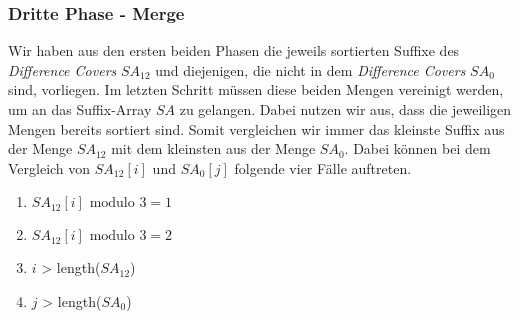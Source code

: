 \subsubsection{Dritte Phase - Merge}
\label{dc3:algorithmus:phase3}


Wir haben aus den ersten beiden Phasen die jeweils sortierten Suffixe des \emph{Difference Covers} $SA_{12}$ und diejenigen, die nicht in dem \emph{Difference Covers} $SA_{0}$ sind, vorliegen. Im letzten Schritt müssen diese beiden Mengen vereinigt werden, um an das Suffix-Array $SA$ zu gelangen. Dabei nutzen wir aus, dass die jeweiligen Mengen bereits sortiert sind. Somit vergleichen wir immer das kleinste Suffix aus der Menge $SA_{12}$ mit dem kleinsten aus der Menge $SA_{0}$. Dabei können bei dem Vergleich von $SA_{12}[i]$ und $SA_{0}[j]$ folgende vier Fälle auftreten.
\begin{enumerate}
	\item $SA_{12}[i] \text{ modulo } 3 = 1$ \label{option1}
	\item $SA_{12}[i] \text{ modulo } 3 = 2$ \label{option2}
	\item $i$ > length($SA_{12}$) \label{option3}
	\item $j$ > length($SA_{0}$) \label{option4}
\end{enumerate}

